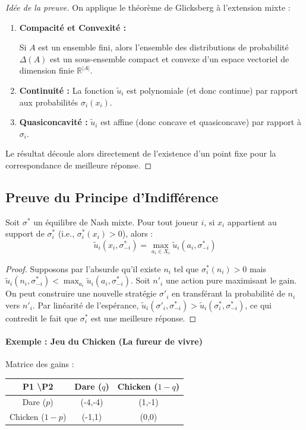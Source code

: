 \begin{proof}[Idée de la preuve]
On applique le théorème de Glicksberg à l'extension mixte :
\begin{enumerate}
    \item \textbf{Compacité et Convexité :} 
    \begin{lemma}
    Si $A$ est un ensemble fini, alors l'ensemble des distributions de probabilité $\Delta(A)$ est un sous-ensemble compact et convexe d'un espace vectoriel de dimension finie $\mathbb{R}^{|A|}$.
    \end{lemma}
    \item \textbf{Continuité :} La fonction $\tilde{u}_i$ est polynomiale (et donc continue) par rapport aux probabilités $\sigma_i(x_i)$.
    \item \textbf{Quasiconcavité :} $\tilde{u}_i$ est affine (donc concave et quasiconcave) par rapport à $\sigma_i$.
\end{enumerate}
Le résultat découle alors directement de l'existence d'un point fixe pour la correspondance de meilleure réponse.
\end{proof}

\subsection{Preuve du Principe d'Indifférence}

\begin{proposition}
Soit $\sigma^*$ un équilibre de Nash mixte. Pour tout joueur $i$, si $x_i$ appartient au support de $\sigma^*_i$ (i.e., $\sigma^*_i(x_i) > 0$), alors :
$$\tilde{u}_i(x_i, \sigma^*_{-i}) = \max_{a_i \in X_i} \tilde{u}_i(a_i, \sigma^*_{-i})$$
\end{proposition}

\begin{proof}
Supposons par l'absurde qu'il existe $n_i$ tel que $\sigma^*_i(n_i) > 0$ mais $\tilde{u}_i(n_i, \sigma^*_{-i}) < \max_{a_i} \tilde{u}_i(a_i, \sigma^*_{-i})$. Soit $n'_i$ une action pure maximisant le gain. On peut construire une nouvelle stratégie $\sigma'_i$ en transférant la probabilité de $n_i$ vers $n'_i$. Par linéarité de l'espérance, $\tilde{u}_i(\sigma'_i, \sigma^*_{-i}) > \tilde{u}_i(\sigma^*_i, \sigma^*_{-i})$, ce qui contredit le fait que $\sigma^*_i$ est une meilleure réponse.
\end{proof}

\paragraph{Exemple : Jeu du Chicken (La fureur de vivre)}
Matrice des gains :
\begin{center}
\begin{tabular}{c|c|c}
P1 \textbackslash P2 & Dare ($q$) & Chicken ($1-q$) \\ \hline
Dare ($p$) & (-4,-4) & (1,-1) \\ \hline
Chicken ($1-p$) & (-1,1) & (0,0)
\end{tabular}
\end{center}

